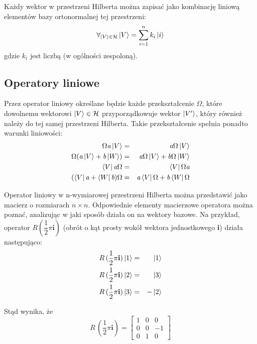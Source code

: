 \documentclass[12pt,a4paper,twoside,openany]{book}
\begin{document}
Każdy wektor w przestrzeni Hilberta można zapisać jako kombinację liniową elementów bazy ortonormalnej tej przestrzeni:
\begin{equation}
    \forall_{\ket{V}\in\mathcal{H}}\ket{V} = \sum_{i=1}^{n}k_{i}\ket{i}
\end{equation}
gdzie $k_{i}$ jest liczbą (w ogólności zespoloną).

\subsection{Operatory liniowe}
Przez operator liniowy określane będzie każde przekształcenie $\Omega$, które dowolnemu wektorowi $\ket{V} \in \mathcal{H}$ przyporządkowuje wektor $\ket{V'}$, który również należy do tej samej przestrzeni Hilberta. Takie przekształcenie spełnia ponadto warunki liniowości:
\begin{eqnarray}
    \Omega\textit{a}\ket{V} &=& \textit{a}\Omega\ket{V} \\
    \Omega(\textit{a}\ket{V} + \textit{b}\ket{W}) &=& \textit{a}\Omega\ket{V} + \textit{b}\Omega\ket{W} \\
    \bra{V}\textit{a}\Omega &=& \bra{V}\Omega\textit{a} \\
    (\bra{V}\textit{a} + \bra{W}\textit{b})\Omega &=& \textit{a}\bra{V}\Omega + \textit{b}\bra{W}\Omega
\end{eqnarray}

Operator liniowy w n-wymiarowej przestrzeni Hilberta można przedstawić jako macierz o rozmiarach $n\times n$. Odpowiednie elementy macierzowe operatora można poznać, analizując w jaki sposób działa on na wektory bazowe. Na przykład, operator $R(\dfrac{1}{2}\pi\textbf{i})$ (obrót o kąt prosty wokół wektora jednostkowego \textbf{i}) działa następująco:
\begin{eqnarray}
    R\,(\dfrac{1}{2}\pi\textbf{i})\ket{1} &=& \ket{1} \\
    R\,(\dfrac{1}{2}\pi\textbf{i})\ket{2} &=& \ket{3} \\
    R\,(\dfrac{1}{2}\pi\textbf{i})\ket{3} &=& -\ket{2}
\end{eqnarray}

Stąd wynika, że
\begin{equation}
R\,(\dfrac{1}{2}\pi\textbf{i}) = \begin{bmatrix}
1 & 0 & 0\\
0 & 0 & -1\\
0 & 1 & 0
\end{bmatrix}
\end{equation}
\end{document}
